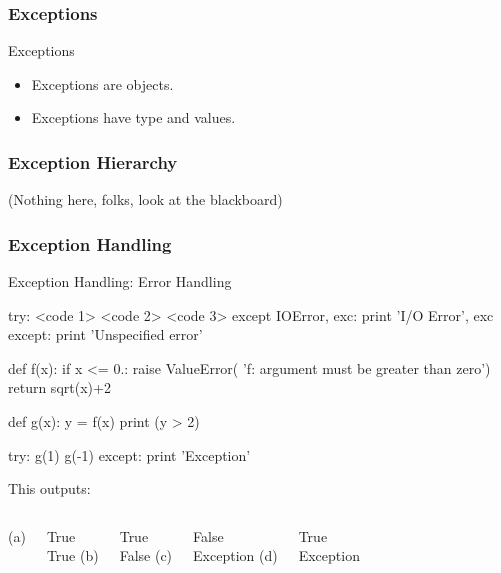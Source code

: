 \begin{frame}[fragile]
\frametitle{Exceptions}

\begin{block}{Exceptions}
\begin{itemize}
\item Exceptions are \alert{objects}.
\item Exceptions have \alert{type} and \alert{values}.
\end{itemize}
\end{block}
\end{frame}

\begin{frame}[fragile]
\frametitle{Exception Hierarchy}

(Nothing here, folks, look at the blackboard)

\end{frame}

\begin{frame}[fragile]
\frametitle{Exception Handling}

\begin{block}{Exception Handling: Error Handling}
\begin{python}
try:
    <code 1>
    <code 2>
    <code 3>
except IOError, exc:
    print 'I/O Error', exc
except:
    print 'Unspecified error'
\end{python}
\end{block}
\end{frame}

\begin{frame}[fragile]

\begin{python}
def f(x):
    if x <= 0.:
        raise ValueError(
            'f: argument must be greater than zero')
    return sqrt(x)+2

def g(x):
    y = f(x)
    print (y > 2) 

try:
    g(1)
    g(-1)
except:
    print 'Exception'
\end{python}

This outputs:

\begin{columns}
(a)\par
True\\True
{}
(b)\par
True\\False
{}
(c)\par
False\\Exception
{}
(d)\par
True\\Exception
\end{columns}

\end{frame}


